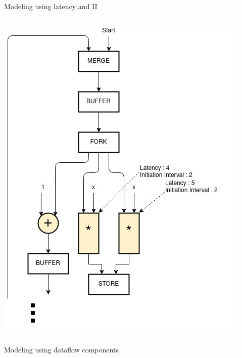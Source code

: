 \documentclass{beamer}
\begin{document}
\begin{frame}{Modeling using latency and II}
\begin{columns}[T]
\begin{column}{0.25\textwidth}
      \includegraphics[scale=0.25]{latency_shared.png}
    \end{column}
  \end{columns}
\end{frame}

\begin{frame}{Modeling using dataflow components}
    
\end{frame}
\end{document}

